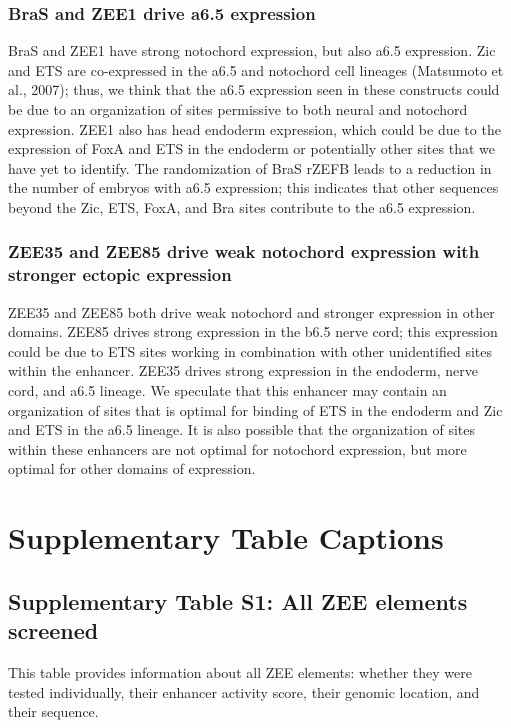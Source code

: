 \subsubsection{BraS and ZEE1 drive a6.5 expression}
BraS and ZEE1 have strong notochord expression, but also a6.5 expression. Zic and ETS are co-expressed in the a6.5 and notochord cell lineages (Matsumoto et al., 2007); thus, we think that the a6.5 expression seen in these constructs could be due to an organization of sites permissive to both neural and notochord expression. ZEE1 also has head endoderm expression, which could be due to the expression of FoxA and ETS in the endoderm or potentially other sites that we have yet to identify. The randomization of BraS rZEFB leads to a reduction in the number of embryos with a6.5 expression; this indicates that other sequences beyond the Zic, ETS, FoxA, and Bra sites contribute to the a6.5 expression. 

\subsubsection{ZEE35 and ZEE85 drive weak notochord expression with stronger ectopic expression}
ZEE35 and ZEE85 both drive weak notochord and stronger expression in other domains. ZEE85 drives strong expression in the b6.5 nerve cord; this expression could be due to ETS sites working in combination with other unidentified sites within the enhancer. ZEE35 drives strong expression in the endoderm, nerve cord, and a6.5 lineage. We speculate that this enhancer may contain an organization of sites that is optimal for binding of ETS in the endoderm and Zic and ETS in the a6.5 lineage. It is also possible that the organization of sites within these enhancers are not optimal for notochord expression, but more optimal for other domains of expression.

\section{Supplementary Table Captions}

\subsection{Supplementary Table S1: All ZEE elements screened}
This table provides information about all ZEE elements: whether they were tested individually, their enhancer activity score, their genomic location, and their sequence.

